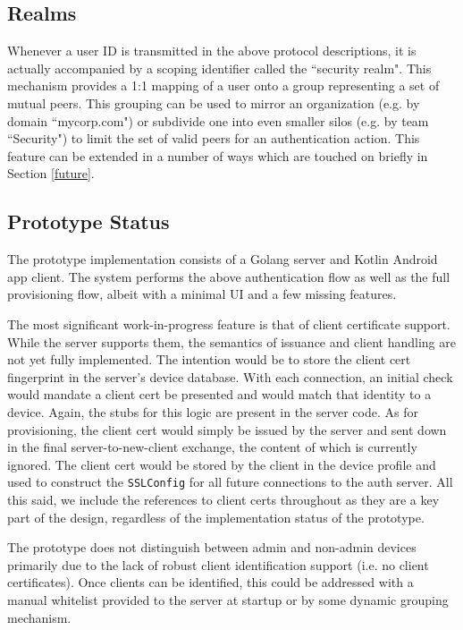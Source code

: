 \documentclass[letterpaper, 10 pt, conference]{ieeeconf}
\begin{document}
  \subsection{Realms} \label{realms}
  Whenever a user ID is transmitted in the above protocol descriptions, it is actually accompanied by a scoping identifier called the ``security realm".
  This mechanism provides a 1:1 mapping of a user onto a group representing a set of mutual peers.
  This grouping can be used to mirror an organization (e.g. by domain ``mycorp.com") or subdivide one into even smaller silos (e.g. by team ``Security") to limit the set of valid peers for an authentication action.
  This feature can be extended in a number of ways which are touched on briefly in Section \ref{future}.

\subsection{Prototype Status} \label{prototype}
  The prototype implementation consists of a Golang server and Kotlin Android app client.
  The system performs the above authentication flow as well as the full provisioning flow, albeit with a minimal UI and a few missing features.

  The most significant work-in-progress feature is that of client certificate support.
  While the server supports them, the semantics of issuance and client handling are not yet fully implemented.
  The intention would be to store the client cert fingerprint in the server's device database.
  With each connection, an initial check would mandate a client cert be presented and would match that identity to a device.
  Again, the stubs for this logic are present in the server code.
  As for provisioning, the client cert would simply be issued by the server and sent down in the final server-to-new-client exchange, the content of which is currently ignored.
  The client cert would be stored by the client in the device profile and used to construct the \texttt{SSLConfig} for all future connections to the auth server.
  All this said, we include the references to client certs throughout as they are a key part of the design, regardless of the implementation status of the prototype.

  The prototype does not distinguish between admin and non-admin devices primarily due to the lack of robust client identification support (i.e. no client certificates).
  Once clients can be identified, this could be addressed with a manual whitelist provided to the server at startup or by some dynamic grouping mechanism.
\end{document}
